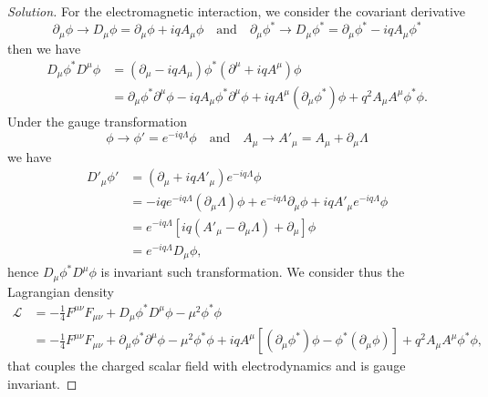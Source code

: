 \begin{proof}[Solution]
   For the electromagnetic interaction, we consider the covariant derivative
   \begin{equation*}
       \partial_\mu\phi \to D_\mu\phi = \partial_\mu\phi + iq A_\mu\phi
       \quad\text{and}\quad
       \partial_\mu \phi^* \to D_\mu \phi^* = \partial_\mu \phi^* - iq A_\mu\phi^*
   \end{equation*}
   then we have
   \begin{align*}
      D_\mu \phi^* D^\mu \phi &= (\partial_\mu - iq A_\mu)\phi^* (\partial^\mu + iq A^\mu) \phi\\
                              &= \partial_\mu\phi^* \partial^\mu \phi - iq A_\mu \phi^* \partial^\mu \phi + iq A^\mu(\partial_\mu \phi^*)\phi + q^2 A_\mu A^\mu \phi^* \phi.
   \end{align*}
   Under the gauge transformation
   \begin{equation*}
      \phi \to \phi' = e^{-iq \Lambda} \phi
      \quad\text{and}\quad
      A_\mu \to A'_\mu = A_\mu + \partial_\mu \Lambda
   \end{equation*}
   we have
   \begin{align*}
      D'_\mu \phi' &= (\partial_\mu + i q A'_\mu) e^{-iq \Lambda} \phi \\
      &= -iq e^{-i q\Lambda}(\partial_\mu \Lambda) \phi + e^{-iq \Lambda} \partial_\mu \phi + iq A'_\mu e^{-iq \Lambda} \phi\\
      &= e^{-iq \Lambda} \left[iq(A'_\mu - \partial_\mu \Lambda) + \partial_\mu\right]\phi\\
      &= e^{-iq \Lambda} D_\mu\phi,
   \end{align*}
   hence \(D_\mu \phi^* D^\mu \phi\) is invariant such transformation. We consider thus the Lagrangian density
   \begin{align*}
      \mathcal{L} &= -\frac14 F^{\mu\nu}F_{\mu\nu} + D_\mu\phi^* D^\mu \phi - \mu^2 \phi^*\phi\\
                  &= -\frac14 F^{\mu\nu}F_{\mu\nu} +  \partial_\mu \phi^*\partial^\mu \phi - \mu^2\phi^*\phi + iq A^\mu \left[(\partial_\mu \phi^*)\phi - \phi^*(\partial_\mu\phi)\right] + q^2 A_\mu A^\mu \phi^*\phi,
   \end{align*}
   that couples the charged scalar field with electrodynamics and is gauge invariant.


\end{proof}
